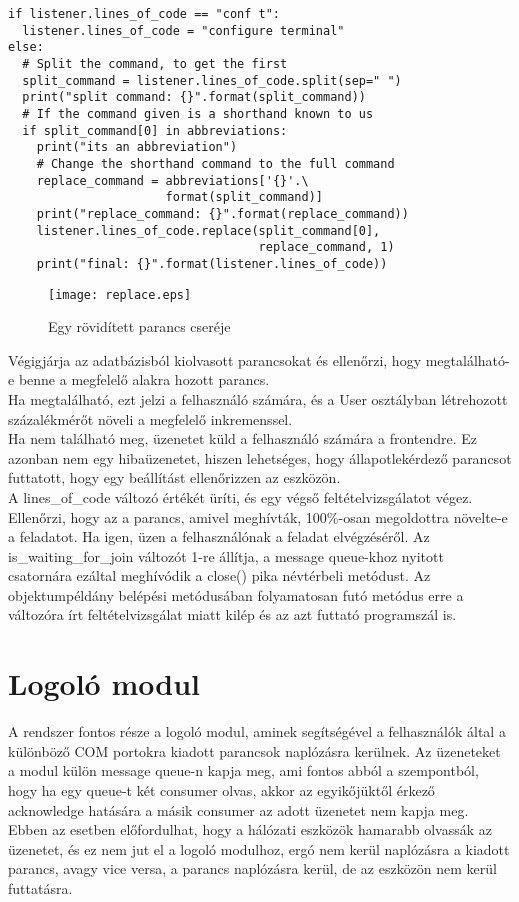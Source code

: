 \documentclass[12pt]{report}
\begin{document}
\begin{verbatim}
if listener.lines_of_code == "conf t":
  listener.lines_of_code = "configure terminal"
else:
  # Split the command, to get the first
  split_command = listener.lines_of_code.split(sep=" ")
  print("split command: {}".format(split_command))
  # If the command given is a shorthand known to us
  if split_command[0] in abbreviations:
    print("its an abbreviation")
    # Change the shorthand command to the full command
    replace_command = abbreviations['{}'.\
                      format(split_command)]
    print("replace_command: {}".format(replace_command))
    listener.lines_of_code.replace(split_command[0],
                                   replace_command, 1)
    print("final: {}".format(listener.lines_of_code))
\end{verbatim}

\begin{figure}[h]
    \centering
    \texttt{[image: replace.eps]}
    \caption{Egy rövidített parancs cseréje}
\end{figure}

Végigjárja az adatbázisból kiolvasott parancsokat és ellenőrzi, hogy megtalálható-e benne a megfelelő alakra hozott parancs.\\
Ha megtalálható, ezt jelzi a felhasználó számára, és a User osztályban létrehozott százalékmérőt növeli a megfelelő inkremenssel.\\
Ha nem található meg, üzenetet küld a felhasználó számára a frontendre. Ez azonban nem egy hibaüzenetet, hiszen lehetséges, hogy állapotlekérdező parancsot futtatott, hogy egy beállítást ellenőrizzen az eszközön.\\
A lines\_of\_code változó értékét üríti, és egy végső feltételvizsgálatot végez. Ellenőrzi, hogy az a parancs, amivel meghívták, 100\%-osan megoldottra növelte-e a feladatot. Ha igen, üzen a felhasználónak a feladat elvégzéséről. Az is\_waiting\_for\_join változót 1-re állítja, a message queue-khoz nyitott csatornára ezáltal meghívódik a close() pika névtérbeli metódust. Az objektumpéldány belépési metódusában folyamatosan futó metódus erre a változóra írt feltételvizsgálat miatt kilép és az azt futtató programszál is.


\section{Logoló modul}


A rendszer fontos része a logoló modul, aminek segítségével a felhasználók által a különböző COM portokra kiadott parancsok naplózásra kerülnek. Az üzeneteket a modul külön message queue-n kapja meg, ami fontos abból a szempontból, hogy ha egy queue-t két consumer olvas, akkor az egyikőjüktől érkező acknowledge hatására a másik consumer az adott üzenetet nem kapja meg. Ebben az esetben előfordulhat, hogy a hálózati eszközök hamarabb olvassák az üzenetet, és ez nem jut el a logoló modulhoz, ergó nem kerül naplózásra a kiadott parancs, avagy vice versa, a parancs naplózásra kerül, de az eszközön nem kerül futtatásra.
\end{document}
